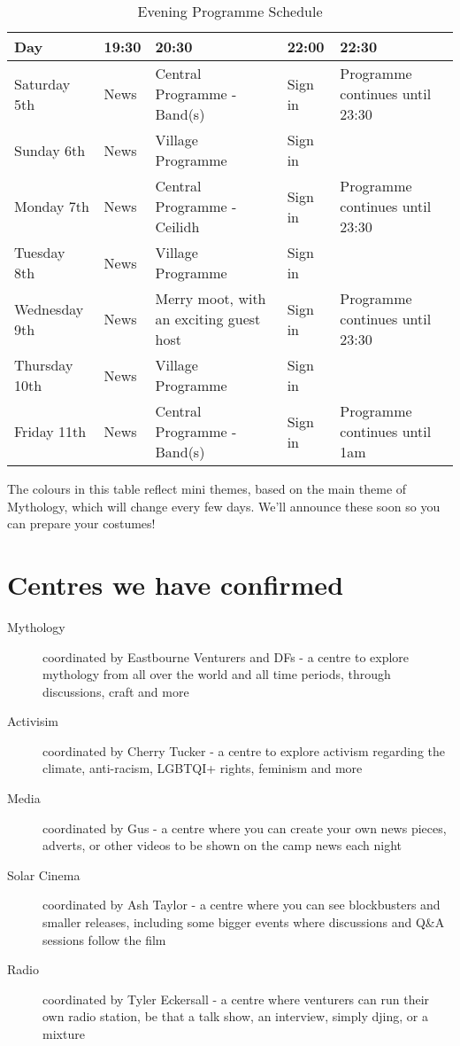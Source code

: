 \documentclass[a4paper, 11pt]{report}
\begin{document}
\begin{table}[H]
    \centering
    {\RaggedRight
    \begin{tabular}{p{} p{} p{} p{} p{}}
    \textbf{Day} & \textbf{19:30} & \textbf{20:30} & \textbf{22:00} & \textbf{22:30} \\
    \hline
    Saturday 5th & News & \cellcolor{wcfDarkGreen}Central Programme  - Band(s) & Sign in & \cellcolor{wcfDarkGreen}Programme continues until 23:30 \\
    \hline
    Sunday 6th & News & \cellcolor{wcfGreen}Village Programme & Sign in & \cellcolor{wcfGreen} \\
    \hline
    Monday 7th & News & \cellcolor{wcfGreen}Central Programme - Ceilidh & Sign in & \cellcolor{wcfGreen}Programme continues until 23:30 \\
    \hline
    Tuesday 8th & News & \cellcolor{wcfYellow}Village Programme & Sign in & \cellcolor{wcfYellow} \\
    \hline
    Wednesday 9th & News & \cellcolor{wcfYellow}Merry moot, with an exciting guest host & Sign in & \cellcolor{wcfYellow}Programme continues until 23:30 \\
    \hline
    Thursday 10th & News & \cellcolor{wcfRed}Village Programme & Sign in & \cellcolor{wcfRed} \\
    \hline
    Friday 11th & News & \cellcolor{wcfRed}Central Programme - Band(s) & Sign in & \cellcolor{wcfRed}Programme continues until 1am\\
    \hline
    \end{tabular}
    }%
    \caption{Evening Programme Schedule}
\end{table}
The colours in this table reflect mini themes, based on the main theme of Mythology, which will change every few days. We'll announce these soon so you can prepare your costumes! 

\section{Centres we have confirmed}
\begin{description}
    \item[Mythology] coordinated by Eastbourne Venturers and DFs - a centre to explore mythology from all over the world and all time periods, through discussions, craft and more
    \item[Activisim] coordinated by Cherry Tucker - a centre to explore activism regarding the climate, anti-racism, LGBTQI+ rights, feminism and more
    \item[Media] coordinated by Gus - a centre where you can create your own news pieces, adverts, or other videos to be shown on the camp news each night
    \item[Solar Cinema]  coordinated by Ash Taylor - a centre where you can see blockbusters and smaller releases, including some bigger events where discussions and Q\&A sessions follow the film
    \item[Radio]  coordinated by Tyler Eckersall - a centre where venturers can run their own radio station, be that a talk show, an interview, simply djing, or a mixture
\end{description}
\end{document}
